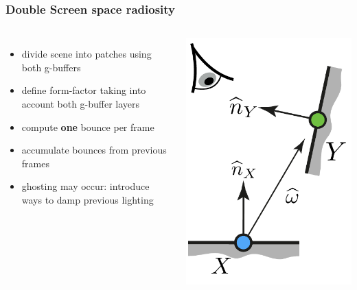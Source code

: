 \documentclass[aspectratio=169]{beamer}
\begin{document}
	\begin{frame}
		\frametitle{Double Screen space radiosity}
		\begin{columns}
				\begin{itemize}
					\item divide scene into patches using both g-buffers
					\item define form-factor taking into account both g-buffer layers
					\item compute \textbf{one} bounce per frame
					\item accumulate bounces from previous frames
					\item ghosting may occur: introduce ways to damp previous lighting
				\end{itemize}
				\includegraphics[height=.8\textwidth]{img/form_factor.png}
		\end{columns}
	\end{frame}	
\end{document}
